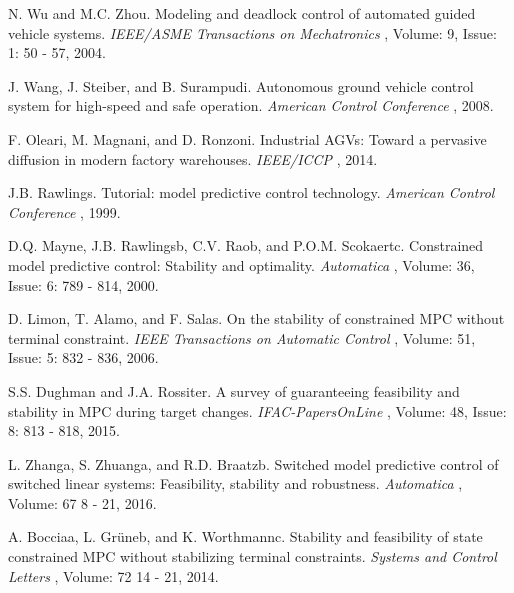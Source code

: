 \documentclass{ifacconf}
\begin{document}
 
\begin{thebibliography}{xx}  %

N. Wu and M.C. Zhou.
\newblock Modeling and deadlock control of automated guided vehicle systems.
\newblock \emph{ IEEE/ASME Transactions on Mechatronics }, Volume: 9, Issue: 1: 50 - 57, 2004.

J. Wang, J. Steiber, and B. Surampudi.
\newblock Autonomous ground vehicle control system for high-speed and safe operation.
\newblock \emph{ American Control Conference }, 2008.


F. Oleari, M. Magnani, and D. Ronzoni.
\newblock Industrial AGVs: Toward a pervasive diffusion in modern factory warehouses.
\newblock \emph{ IEEE/ICCP }, 2014.


J.B. Rawlings.
\newblock Tutorial: model predictive control technology.
\newblock \emph{  American Control Conference }, 1999.

D.Q. Mayne, J.B. Rawlingsb, C.V. Raob, and P.O.M. Scokaertc.
\newblock Constrained model predictive control: Stability and optimality.
\newblock \emph{  Automatica }, Volume: 36, Issue: 6: 789 - 814, 2000.

D. Limon, T. Alamo, and F. Salas.
\newblock On the stability of constrained MPC without terminal constraint.
\newblock \emph{   IEEE Transactions on Automatic Control }, Volume: 51, Issue: 5: 832 - 836, 2006.

S.S. Dughman and J.A. Rossiter.
\newblock A survey of guaranteeing feasibility and stability in MPC during target changes.
\newblock \emph{   IFAC-PapersOnLine }, Volume: 48, Issue: 8: 813 - 818, 2015.

L. Zhanga, S. Zhuanga, and R.D. Braatzb.
\newblock Switched model predictive control of switched linear systems:
Feasibility, stability and robustness.
\newblock \emph{  Automatica  }, Volume: 67 8 - 21, 2016.

A. Bocciaa, L. Grüneb, and K. Worthmannc.
\newblock Stability and feasibility of state constrained MPC without stabilizing terminal constraints.
\newblock \emph{  Systems and Control Letters  }, Volume: 72 14 - 21, 2014.




\end{thebibliography}
\end{document}
